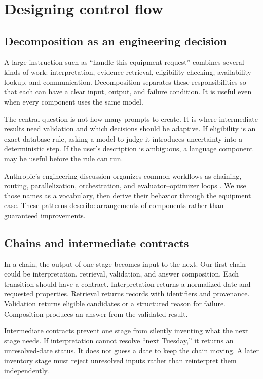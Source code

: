\chapter{Designing control flow}
\section{Decomposition as an engineering decision}
A large instruction such as “handle this equipment request” combines several kinds of work: interpretation, evidence retrieval, eligibility checking, availability lookup, and communication. Decomposition separates these responsibilities so that each can have a clear input, output, and failure condition. It is useful even when every component uses the same model.

The central question is not how many prompts to create. It is where intermediate results need validation and which decisions should be adaptive. If eligibility is an exact database rule, asking a model to judge it introduces uncertainty into a deterministic step. If the user's description is ambiguous, a language component may be useful before the rule can run.

Anthropic's engineering discussion organizes common workflows as chaining, routing, parallelization, orchestration, and evaluator–optimizer loops \cite{effective-agents}. We use those names as a vocabulary, then derive their behavior through the equipment case. These patterns describe arrangements of components rather than guaranteed improvements.

\section{Chains and intermediate contracts}
In a chain, the output of one stage becomes input to the next. Our first chain could be interpretation, retrieval, validation, and answer composition. Each transition should have a contract. Interpretation returns a normalized date and requested properties. Retrieval returns records with identifiers and provenance. Validation returns eligible candidates or a structured reason for failure. Composition produces an answer from the validated result.

Intermediate contracts prevent one stage from silently inventing what the next stage needs. If interpretation cannot resolve “next Tuesday,” it returns an unresolved-date status. It does not guess a date to keep the chain moving. A later inventory stage must reject unresolved inputs rather than reinterpret them independently.

